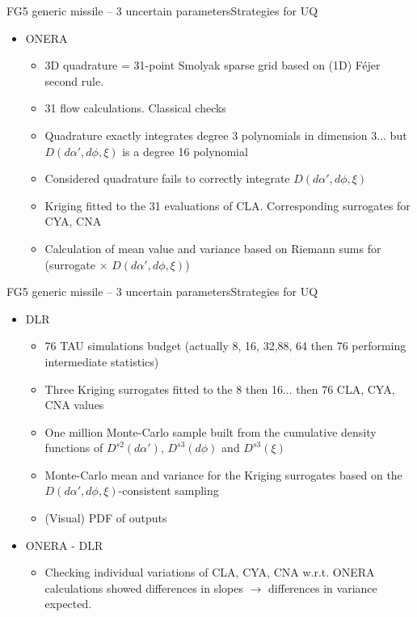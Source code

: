 \documentclass[10pt]{beamer}
\def\vt{\vspace{2mm}}
\def\vr{\vspace{3mm}}
\def\vv{\vspace{5mm}}
\def\begit{\begin{itemize}}
\def\endit{\end{itemize}}
\begin{document}
\begin{frame}{FG5 generic missile -- 3 uncertain parameters}{Strategies for UQ}  

\begit
%
\item ONERA
  \vt 
  \begit
  \item 3D quadrature = 31-point Smolyak sparse grid  based on (1D) F\'ejer second rule.
  \item 31 flow calculations. Classical checks  
  \vr
  \item Quadrature exactly integrates degree 3 polynomials in dimension 3... but $D(d\alpha',d\phi,\xi)$
     is a degree 16 polynomial 
  \item Considered quadrature fails to correctly integrate $D(d\alpha',d\phi,\xi)$
  \vr
  \item Kriging fitted to the 31 evaluations of CLA. Corresponding surrogates for CYA, CNA
  \item Calculation of mean value and variance based on Riemann sums for (surrogate $\times $  $D(d\alpha',d\phi,\xi)$)  
  \endit
%
\endit
%
\end{frame} 
%

\begin{frame}{FG5 generic missile -- 3 uncertain parameters}{Strategies for UQ}  

\begit
%
\item DLR
  \begit
  \item 76 TAU simulations budget (actually 8, 16, 32,88, 64 then 76 performing intermediate statistics)
  \item Three Kriging surrogates fitted to the 8 then 16... then 76 CLA, CYA, CNA values
  \item One million Monte-Carlo sample built from the cumulative density functions of  $D^{s2}(d\alpha')$, $D^{s3}(d\phi)$ and $D^{s3}(\xi)$
  \item Monte-Carlo mean and variance for the Kriging surrogates based on the  $D(d\alpha',d\phi,\xi)$-consistent sampling
  \item (Visual) PDF of outputs
  \vt
  \endit
\vv
\item ONERA - DLR
  \begit
  \item Checking individual variations of CLA, CYA, CNA w.r.t. ONERA calculations showed differences in slopes 
 $\rightarrow$ differences in variance expected.
  \endit
%
\endit
%
\end{frame} 
%
%
\end{document}
